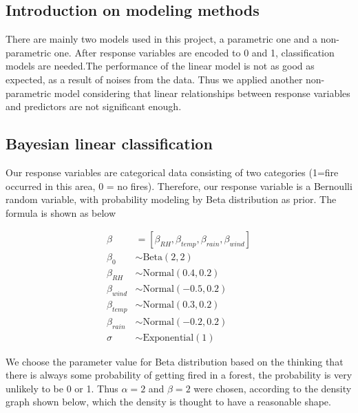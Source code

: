 \documentclass[12pt]{article}
\theoremstyle{plain}
\begin{document}
\begin{spacing}{1}
\begin{flushleft}
 \vspace{2.0mm}
 
 \subsection{Introduction on modeling methods}
 
 There are mainly two models used in this project, a parametric one and a non-parametric one. After response variables are encoded to 0 and 1, classification models are needed.The performance of the linear model is not as good as expected, as a result of noises from the data. Thus we applied another non-parametric model considering that linear relationships between response variables and predictors are not significant enough.
 
 \vspace{2.0mm}
 
 \subsection{Bayesian linear classification}
 Our response variables are categorical data consisting of two categories (1=fire occurred in this area, 0 = no fires). Therefore, our response variable is a Bernoulli random variable, with probability modeling by Beta distribution as prior. The formula is shown as below
 
 \vspace{2.0mm}
 
 	\begin{align*}
 		\beta&=[\beta_{RH},\beta_{temp},\beta_{rain}, \beta_{wind}]\\
 		\beta_0 &\sim \text{Beta}(2, 2) \\
 		\beta_{RH} &\sim \text{Normal}(0.4, 0.2) \\
 		\beta_{wind} &\sim \text{Normal}(-0.5, 0.2) \\
 		\beta_{temp} &\sim \text{Normal}(0.3, 0.2) \\
 		\beta_{rain} &\sim \text{Normal}(-0.2, 0.2) \\
 		\sigma &\sim \text{Exponential}(1)
 	\end{align*}
 
 \vspace{2.0mm}
 
 We choose the parameter value for Beta distribution based on the thinking that there is always some probability of getting fired in a forest, the probability is very unlikely to be 0 or 1. Thus $\alpha = 2$ and $\beta = 2$ were chosen, according to the density graph shown below, which the density is thought to have a reasonable shape.
 

\end{flushleft}
\end{spacing}
\end{document}
